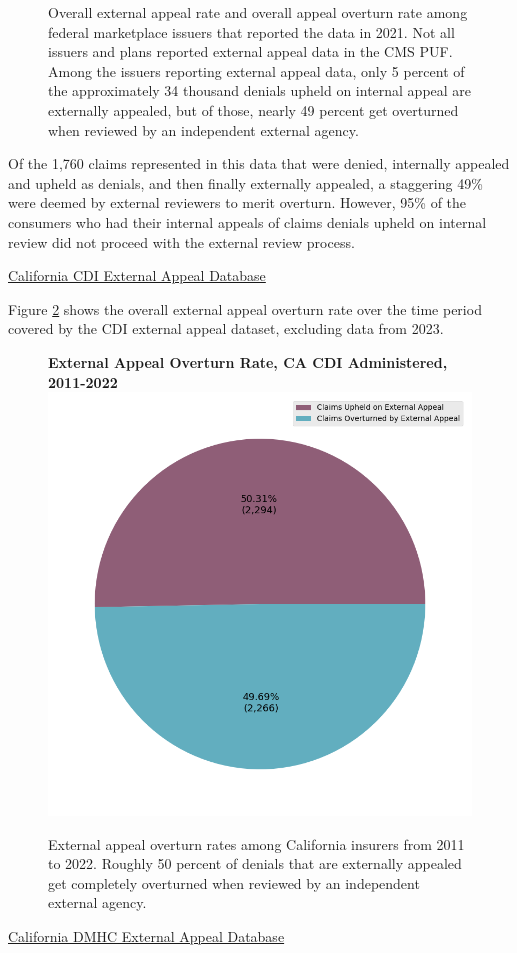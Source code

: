 \documentclass[12pt, a4paper,twoside]{report}
\theoremstyle{plain} %
\theoremstyle{definition} %
\theoremstyle{remark} %
\numberwithin{equation}{chapter}
\begin{document}
\begin{figure}[h!]
\begin{subfigure}[b]{0.49\textwidth}
			\end{subfigure}
			\caption{Overall external appeal rate and overall appeal overturn rate among federal marketplace issuers that reported the data in 2021. Not all issuers and plans reported external appeal data in the CMS PUF. Among the issuers reporting external appeal data, only 5 percent of the approximately 34 thousand denials upheld on internal appeal are externally appealed, but of those, nearly 49 percent get overturned when reviewed by an independent external agency.}
			\label{federalexternalappealpie}
		\end{figure}
		
		
		Of the 1,760 claims represented in this data that were denied, internally appealed and upheld as denials, and then finally externally appealed, a staggering 49\% were deemed by external reviewers to merit overturn. However, 95\% of the consumers who had their internal appeals of claims denials upheld on internal review did not proceed with the external review process.
		
		\underline{California CDI External Appeal Database}
		
		Figure \ref{cacdiexternalappealpie} shows the overall external appeal overturn rate over the time period covered by the CDI external appeal dataset, excluding data from 2023.
		
		
		\begin{figure}[h!]
			\centering
			\textbf{External Appeal Overturn Rate, CA CDI Administered, 2011-2022}
			\includegraphics[width=.4\textwidth]{images/ca_doi_external_appeals/external_appeal_success_rates.png}
			\caption{External appeal overturn rates among California insurers from 2011 to 2022. Roughly 50 percent of denials that are externally appealed get completely overturned when reviewed by an independent external agency.}
			\label{cacdiexternalappealpie}
		\end{figure}
	
	
		\underline{California DMHC External Appeal Database}
\end{document}

